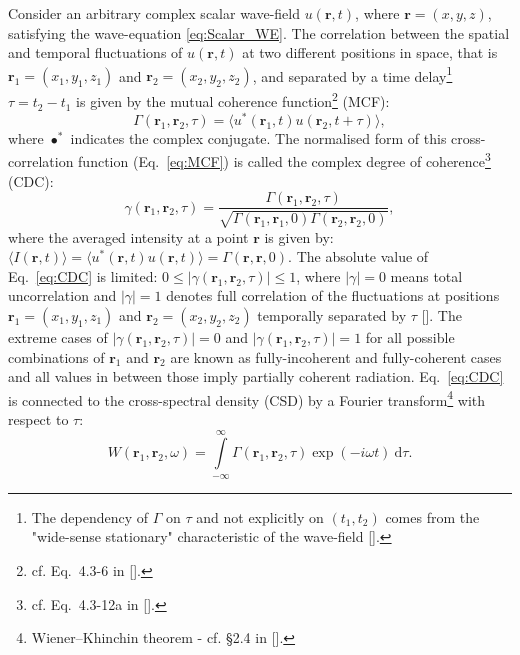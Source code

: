 \begin{refsection}
Consider an arbitrary complex scalar wave-field $u(\textbf{r},t)$, where $\textbf{r}=(x,y,z)$, satisfying the wave-equation \ref{eq:Scalar_WE}. The correlation between the spatial and temporal fluctuations of $u(\textbf{r},t)$ at two different positions in space, that is $\textbf{r}_1 = (x_1,y_1,z_1)$ and $\textbf{r}_2 = (x_2,y_2,z_2)$, and separated by a time delay\footnote{ The dependency of $\Gamma$ on $\tau$ and not explicitly on $(t_1,t_2)$ comes from the "wide-sense stationary" characteristic of the wave-field [\cite{Geloni2008}].} $\tau=t_2-t_1$ is given by the mutual coherence function\footnote{cf. Eq.~4.3-6 in [\cite{Mandel1995}].} (MCF):
\begin{equation}\label{eq:MCF}
    \Gamma(\textbf{r}_1,\textbf{r}_2,\tau) = \big\langle u^*(\textbf{r}_1,t)u(\textbf{r}_2,t+\tau)\big\rangle,
\end{equation}
where $\bullet^*$ indicates the complex conjugate. The normalised form of this cross-correlation function (Eq.~\ref{eq:MCF}) is called the complex degree of coherence\footnote{cf. Eq.~4.3-12a in [\cite{Mandel1995}].} (CDC):
\begin{equation}\label{eq:CDC}
    \gamma(\textbf{r}_1,\textbf{r}_2,\tau) = \frac{\Gamma(\textbf{r}_1,\textbf{r}_2,\tau)}{\sqrt{\Gamma(\textbf{r}_1,\textbf{r}_1,0)\Gamma(\textbf{r}_2,\textbf{r}_2,0)}},
\end{equation}
where the averaged intensity at a point $\textbf{r}$ is given by: $\big\langle I(\textbf{r},t)\big\rangle = \big\langle u^*(\textbf{r},t)u(\textbf{r},t)\big\rangle = \Gamma(\textbf{r},\textbf{r},0)$. The absolute value of Eq.~\ref{eq:CDC} is limited: $0\leq|\gamma(\textbf{r}_1,\textbf{r}_2,\tau)|\leq 1$, where $|\gamma|=0$ means total uncorrelation and $|\gamma|=1$ denotes full correlation of the fluctuations at positions  $\textbf{r}_1 = (x_1,y_1,z_1)$ and $\textbf{r}_2 = (x_2,y_2,z_2)$ temporally separated by $\tau$ [\cite[\textit{§11}]{Saleh2019}]. The extreme cases of $|\gamma(\textbf{r}_1,\textbf{r}_2,\tau)|=0$ and $|\gamma(\textbf{r}_1,\textbf{r}_2,\tau)|=1$ for all possible combinations of $\textbf{r}_1$ and $\textbf{r}_2$ are known as fully-incoherent and fully-coherent cases and all values in between those imply partially coherent radiation. Eq.~\ref{eq:CDC} is connected to the cross-spectral density (CSD) by a Fourier transform\footnote{Wiener–Khinchin theorem - cf. §2.4 in [\cite{Mandel1995}].} with respect to $\tau$:
\begin{equation}\label{eq:CSD}
    W(\textbf{r}_1,\textbf{r}_2,\omega)=\int\limits_{-\infty}^\infty{\Gamma(\textbf{r}_1,\textbf{r}_2, \tau)\exp{(-i\omega t)}~\mathrm{d}\tau}.

\end{equation}
\end{refsection}
